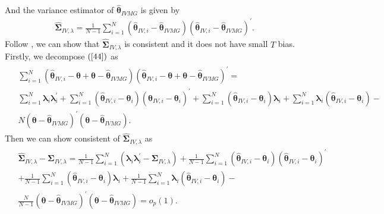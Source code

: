 \documentclass[12pt,a4paper,hyperref]{article}
\begin{document}
And the variance estimator of $\hat{\boldsymbol{\theta}}_{IVMG}$ is given by
\begin{align}
\hat{\boldsymbol{\Sigma}}_{IV,\lambda}=\frac{1}{N-1}\sum^{N}_{i=1}\left( \hat{\boldsymbol{\theta}}_{IV,i}- \hat{\boldsymbol{\theta}}_{IVMG}\right)\left( \hat{\boldsymbol{\theta}}_{IV,i}- \hat{\boldsymbol{\theta}}_{IVMG}\right)^{'}. \label{44}
\end{align}
Follow \citet{Norkute:2019}, we can show that $\hat{\boldsymbol{\Sigma}}_{IV,\lambda}$ is consistent and it does not have small $T$ bias.
Firstly, we decompose $(\ref{44})$ as
\begin{align}
\begin{split}
&\sum^{N}_{i=1}\left( \hat{\boldsymbol{\theta}}_{IV,i}- \boldsymbol{\theta}+\boldsymbol{\theta}-    \hat{\boldsymbol{\theta}}_{IVMG}\right)\left( \hat{\boldsymbol{\theta}}_{IV,i}- \boldsymbol{\theta}+\boldsymbol{\theta}-    \hat{\boldsymbol{\theta}}_{IVMG}\right)^{'}= \\
& \sum^{N}_{i=1} \boldsymbol{\lambda}_{i}\boldsymbol{\lambda}^{'}_{i}+\sum^{N}_{i=1}\left(\hat{\boldsymbol{\theta}}_{IV,i}-\boldsymbol{\theta}_{i} \right)\left(\hat{\boldsymbol{\theta}}_{IV,i}-\boldsymbol{\theta}_{i} \right)^{'}+\sum^{N}_{i=1}\left(\hat{\boldsymbol{\theta}}_{IV,i}-\boldsymbol{\theta}_{i}  \right) \boldsymbol{\lambda}_{i}+\sum^{N}_{i=1}\boldsymbol{\lambda}_{i} \left(\hat{\boldsymbol{\theta}}_{IV,i}-\boldsymbol{\theta}_{i}  \right) -\\
&N\left(\boldsymbol{\theta}-\hat{\boldsymbol{\theta}}_{IVMG} \right)^{'}\left(\boldsymbol{\theta}-\hat{\boldsymbol{\theta}}_{IVMG} \right). \label{45}
\end{split}
\end{align}
Then we can show consistent of $\hat{\boldsymbol{\Sigma}}_{IV,\lambda}$ as
\begin{align}
\begin{split}
&\hat{\boldsymbol{\Sigma}}_{IV,\lambda}-\boldsymbol{\Sigma}_{IV,\lambda}=
 \frac{1}{N-1}\sum^{N}_{i=1}\left( \boldsymbol{\lambda}_{i}\boldsymbol{\lambda}^{'}_{i}-\boldsymbol{\Sigma}_{IV,\lambda}\right) +\frac{1}{N-1}\sum^{N}_{i=1}\left(\hat{\boldsymbol{\theta}}_{IV,i}-\boldsymbol{\theta}_{i} \right)\left(\hat{\boldsymbol{\theta}}_{IV,i}-\boldsymbol{\theta}_{i} \right)^{'} \\
&+\frac{1}{N-1}\sum^{N}_{i=1}\left(\hat{\boldsymbol{\theta}}_{IV,i}-\boldsymbol{\theta}_{i}  \right) \boldsymbol{\lambda}_{i}+\frac{1}{N-1}\sum^{N}_{i=1}\boldsymbol{\lambda}_{i} \left(\hat{\boldsymbol{\theta}}_{IV,i}-\boldsymbol{\theta}_{i}  \right) -\\
&\frac{N}{N-1}\left(\boldsymbol{\theta}-\hat{\boldsymbol{\theta}}_{IVMG} \right)^{'}\left(\boldsymbol{\theta}-\hat{\boldsymbol{\theta}}_{IVMG} \right)  =o_{p}(1).
\end{split}
\end{align}
\end{document}
